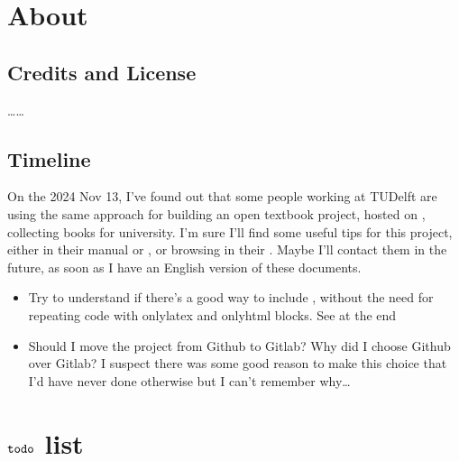 \documentclass[letterpaper,10pt,english]{jupyterBook}
\begin{document}
\sphinxstepscope


\chapter{About}
\label{\detokenize{ch/about:about}}\label{\detokenize{ch/about:bbooks-about}}\label{\detokenize{ch/about::doc}}

\section{Credits and License}
\label{\detokenize{ch/about:credits-and-license}}
\sphinxAtStartPar
……


\section{Timeline}
\label{\detokenize{ch/about:timeline}}
\sphinxAtStartPar
{}

\sphinxAtStartPar
{}
On the 2024 Nov 13, I’ve found out that some people working at TUDelft are using the same approach for building an open textbook project, hosted on , collecting books for university. I’m sure I’ll find some useful tips for this project, either in their manual or , or browsing in their .
Maybe I’ll contact them in the future, as soon as I have an English version of these documents.
\begin{itemize}
\item {} 
\sphinxAtStartPar
Try to understand if there’s a good way to include , without the need for repeating code with only\sphinxhyphen{}latex and only\sphinxhyphen{}html blocks. See at the end 

\item {} 
\sphinxAtStartPar
Should I move the project from Github to Gitlab? Why did I choose Github over Gitlab? I suspect there was some good reason to make this choice \sphinxhyphen{} that I’d have never done otherwise \sphinxhyphen{} but I can’t remember why…

\end{itemize}

\sphinxstepscope


\chapter{\protect\(\texttt{todo}\protect\) list}
\label{\detokenize{ch/todo:texttt-todo-list}}\label{\detokenize{ch/todo:bbooks-todo}}\label{\detokenize{ch/todo::doc}}






\renewcommand{\indexname}{Index}
\printindex
\end{document}
